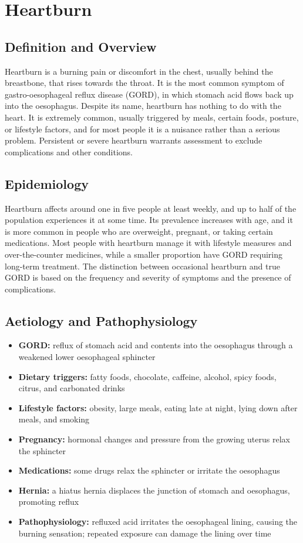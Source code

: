 \chapter{Heartburn}

\section*{Definition and Overview}
Heartburn is a burning pain or discomfort in the chest, usually behind the breastbone, that rises towards the throat. It is the most common symptom of gastro-oesophageal reflux disease (GORD), in which stomach acid flows back up into the oesophagus. Despite its name, heartburn has nothing to do with the heart. It is extremely common, usually triggered by meals, certain foods, posture, or lifestyle factors, and for most people it is a nuisance rather than a serious problem. Persistent or severe heartburn warrants assessment to exclude complications and other conditions.

\section*{Epidemiology}
Heartburn affects around one in five people at least weekly, and up to half of the population experiences it at some time. Its prevalence increases with age, and it is more common in people who are overweight, pregnant, or taking certain medications. Most people with heartburn manage it with lifestyle measures and over-the-counter medicines, while a smaller proportion have GORD requiring long-term treatment. The distinction between occasional heartburn and true GORD is based on the frequency and severity of symptoms and the presence of complications.

\section*{Aetiology and Pathophysiology}
\begin{itemize}
    \item \textbf{GORD:} reflux of stomach acid and contents into the oesophagus through a weakened lower oesophageal sphincter
    \item \textbf{Dietary triggers:} fatty foods, chocolate, caffeine, alcohol, spicy foods, citrus, and carbonated drinks
    \item \textbf{Lifestyle factors:} obesity, large meals, eating late at night, lying down after meals, and smoking
    \item \textbf{Pregnancy:} hormonal changes and pressure from the growing uterus relax the sphincter
    \item \textbf{Medications:} some drugs relax the sphincter or irritate the oesophagus
    \item \textbf{Hernia:} a hiatus hernia displaces the junction of stomach and oesophagus, promoting reflux
    \item \textbf{Pathophysiology:} refluxed acid irritates the oesophageal lining, causing the burning sensation; repeated exposure can damage the lining over time
\end{itemize}

